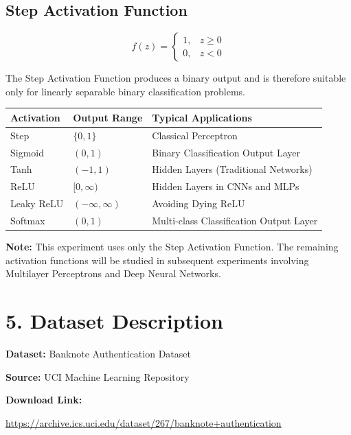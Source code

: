 \documentclass[11pt]{article}
\begin{document}
\subsection*{Step Activation Function}

\[
f(z)=
\begin{cases}
1,&z\ge0\\
0,&z<0
\end{cases}
\]

The Step Activation Function produces a binary output and is therefore suitable only for linearly separable binary classification problems.

\begin{center}
\begin{tabular}{|p{2.5cm}|p{3cm}|p{6cm}|}
\hline
\textbf{Activation} & \textbf{Output Range} & \textbf{Typical Applications}\\
\hline
Step & $\{0,1\}$ & Classical Perceptron\\
\hline
Sigmoid & $(0,1)$ & Binary Classification Output Layer\\
\hline
Tanh & $(-1,1)$ & Hidden Layers (Traditional Networks)\\
\hline
ReLU & $[0,\infty)$ & Hidden Layers in CNNs and MLPs\\
\hline
Leaky ReLU & $(-\infty,\infty)$ & Avoiding Dying ReLU\\
\hline
Softmax & $(0,1)$ & Multi-class Classification Output Layer\\
\hline
\end{tabular}
\end{center}

\textbf{Note:} This experiment uses only the Step Activation Function. The remaining activation functions will be studied in subsequent experiments involving Multilayer Perceptrons and Deep Neural Networks.


\section*{5. Dataset Description}

\textbf{Dataset:} Banknote Authentication Dataset

\textbf{Source:} UCI Machine Learning Repository

\textbf{Download Link:}

\url{https://archive.ics.uci.edu/dataset/267/banknote+authentication}
\end{document}
